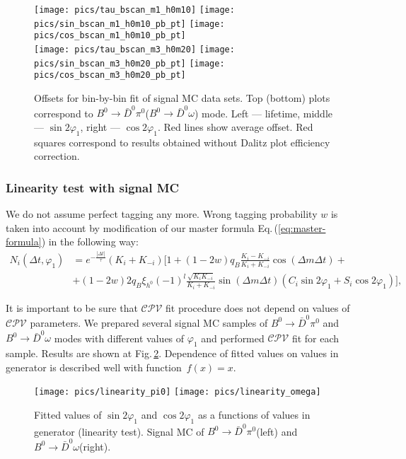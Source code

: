 \documentclass[preprint,aps,showpacs]{revtex4}
\newcommand{\cpvconj}{\ensuremath{\mathcal{CPV}}\xspace}
\newcommand{\sindbeta}{\ensuremath{\sin{2\varphi_1}}\xspace}
\newcommand{\cosdbeta}{\ensuremath{\cos{2\varphi_1}}\xspace}
\newcommand{\bdpi}{\ensuremath{B^0\to \bar D^0\pi^0}\xspace}
\newcommand{\bdomega}{\ensuremath{B^0\to \bar D^0\omega}\xspace}
\begin{document}
\begin{figure}[htb]
 \texttt{[image: pics/tau\_bscan\_m1\_h0m10]}
 \texttt{[image: pics/sin\_bscan\_m1\_h0m10\_pb\_pt]}
 \texttt{[image: pics/cos\_bscan\_m1\_h0m10\_pb\_pt]}\\
 \texttt{[image: pics/tau\_bscan\_m3\_h0m20]}
 \texttt{[image: pics/sin\_bscan\_m3\_h0m20\_pb\_pt]}
 \texttt{[image: pics/cos\_bscan\_m3\_h0m20\_pb\_pt]}
 \caption{Offsets for bin-by-bin fit of signal MC data sets. Top (bottom) plots correspond to \bdpi (\bdomega) mode. Left --- lifetime, middle --- \sindbeta, right --- \cosdbeta. Red lines show average offset. Red squares correspond to results obtained without Dalitz plot efficiency correction.}
 \label{fig:bin-by-bin}
\end{figure}

\subsubsection{Linearity test with signal MC}\label{sec:mc_cpv_linearity}
We do not assume perfect tagging any more. Wrong tagging probability $w$ is taken into account by modification of our master formula Eq.\,(\ref{eq:master-formula}) in the following way:
\begin{equation}\label{eq:master-formula-with-tag}
 \begin{split}
  N_i\left(\Delta t,\varphi_1\right) &= e^{-\frac{\left|\Delta t\right|}{\tau}}\left(K_{i}+K_{-i}\right)[ 1 + (1-2w)q_{B}\frac{K_{i}-K_{-i}}{K_{i}+K_{-i}}\cos\left(\Delta m\Delta t\right)+\\
  &+(1-2w)2q_{B}\xi_{h^0}(-1)^l\frac{\sqrt{K_iK_{-i}}}{K_{i}+K_{-i}}\sin\left(\Delta m\Delta t\right)\left(C_i\sin2\varphi_1+S_i\cos2\varphi_1\right)],
 \end{split}
\end{equation}

It is important to be sure that \cpvconj fit procedure does not depend on values of \cpvconj parameters. We prepared several signal MC samples of \bdpi and \bdomega modes with different values of $\varphi_1$ and performed \cpvconj fit for each sample. Results are shown at Fig.\,\ref{fig:mc_cpv_linearity}. Dependence of fitted values on values in generator is described well with function~$f(x) = x$.

\begin{figure}[htb]
 \texttt{[image: pics/linearity\_pi0]}
 \texttt{[image: pics/linearity\_omega]}
 \caption{Fitted values of \sindbeta and \cosdbeta as a functions of values in generator (linearity test). Signal MC of \bdpi (left) and \bdomega (right).}
 \label{fig:mc_cpv_linearity}
\end{figure}
\end{document}
